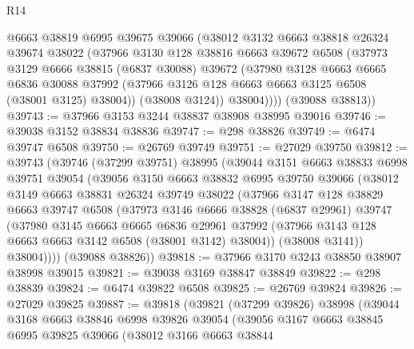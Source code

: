 \begin{lexlean}{R14}
\begin{coremodule}
          @6663
          @38819
          @6995
          @39675
          @39066
          (@38012
            @3132
            @6663
            @38818
            @26324
            @39674
            @38022
            (@37966
              @3130
              @128
              @38816
              @6663
              @39672
              @6508
              (@37973
                @3129
                @6666
                @38815
                (@6837 @30088)
                @39672
                (@37980
                  @3128
                  @6663
                  @6665
                  @6836
                  @30088
                  @37992
                  (@37966 @3126 @128 @6663 @6663 @3125 @6508 (@38001 @3125) @38004))
                (@38008 @3124))
              @38004))))
      (@39088 @38813))
@39743 := @37966 @3153 @3244 @38837 @38908 @38995 @39016
@39746 := @39038 @3152 @38834 @38836
@39747 := @298 @38826
@39749 := @6474 @39747 @6508
@39750 := @26769 @39749
@39751 := @27029 @39750
@39812 := @39743
    (@39746
      (@37299 @39751)
      @38995
      (@39044
        @3151
        @6663
        @38833
        @6998
        @39751
        @39054
        (@39056
          @3150
          @6663
          @38832
          @6995
          @39750
          @39066
          (@38012
            @3149
            @6663
            @38831
            @26324
            @39749
            @38022
            (@37966
              @3147
              @128
              @38829
              @6663
              @39747
              @6508
              (@37973
                @3146
                @6666
                @38828
                (@6837 @29961)
                @39747
                (@37980
                  @3145
                  @6663
                  @6665
                  @6836
                  @29961
                  @37992
                  (@37966 @3143 @128 @6663 @6663 @3142 @6508 (@38001 @3142) @38004))
                (@38008 @3141))
              @38004))))
      (@39088 @38826))
@39818 := @37966 @3170 @3243 @38850 @38907 @38998 @39015
@39821 := @39038 @3169 @38847 @38849
@39822 := @298 @38839
@39824 := @6474 @39822 @6508
@39825 := @26769 @39824
@39826 := @27029 @39825
@39887 := @39818
    (@39821
      (@37299 @39826)
      @38998
      (@39044
        @3168
        @6663
        @38846
        @6998
        @39826
        @39054
        (@39056
          @3167
          @6663
          @38845
          @6995
          @39825
          @39066
          (@38012
            @3166
            @6663
            @38844

\end{coremodule}
\end{lexlean}
